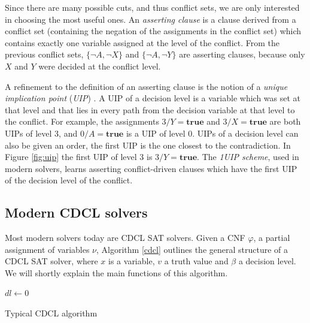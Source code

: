 \documentclass[12pt]{diicc}
\begin{document}
Since there are many possible cuts, and thus conflict sets, we are only interested in choosing the most useful ones. An \textit{asserting clause} \cite{cdcl1} is a clause derived from a conflict set (containing the negation of the assignments in the conflict set) which contains exactly one variable assigned at the level of the conflict. From the previous conflict sets, $\{\neg A,\neg X\}$ and $\{\neg A,\neg Y\}$ are asserting clauses, because only $X$ and $Y$ were decided at the conflict level. 

A refinement to the definition of an asserting clause is the notion of a \textit{unique implication point} (\textit{UIP}) \cite{grasp,cdcl1}. A UIP of a decision level is a variable which was set at that level and that lies in every path from the decision variable at that level to the conflict. For example, the assignments $3/Y=\textbf{true}$ and $3/X=\textbf{true}$ are both UIPs of level 3, and $0/A=\textbf{true}$ is a UIP of level 0. UIPs of a decision level can also be given an order, the first UIP is the one closest to the contradiction. In Figure \ref{fig:uip} the first UIP of level 3 is $3/Y=\textbf{true}$. The \textit{1UIP scheme}, used in modern solvers, learns asserting conflict-driven clauses which have the first UIP of the decision level of the conflict. 

\subsection{Modern CDCL solvers}

Most modern solvers today are CDCL SAT solvers. Given a CNF $\varphi$, a partial assignment of variables $\nu$, Algorithm \ref{cdcl} outlines the general structure of a CDCL SAT solver, where $x$ is a variable, $v$ a truth value and $\beta$ a decision level. We will shortly explain the main functions of this algorithm.

\begin{algorithm}
$dl \leftarrow 0$\\
\caption{Typical CDCL algorithm\label{cdcl}}
\end{algorithm}
\end{document}

